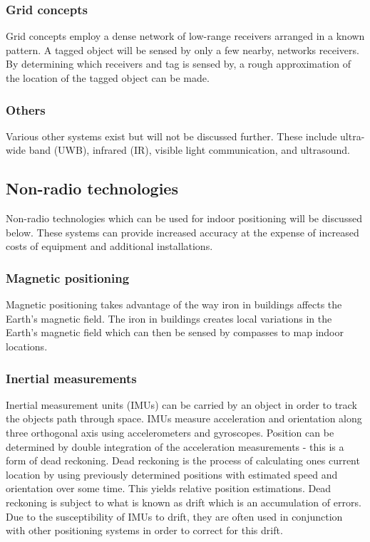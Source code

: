 \documentclass[11pt,a4paper]{article}
\begin{document}
	\subsubsection{Grid concepts}
		Grid concepts employ a dense network of low-range receivers arranged in a known pattern. A tagged object will be sensed by only a few nearby, networks receivers. By determining which receivers and tag is sensed by, a rough approximation of the location of the tagged object can be made.
	
	\subsubsection{Others}
		Various other systems exist but will not be discussed further. These include ultra-wide band (UWB), infrared (IR), visible light communication, and ultrasound.
	
	\subsection{Non-radio technologies}
		Non-radio technologies which can be used for indoor positioning will be discussed below. These systems can provide increased accuracy at the expense of increased costs of equipment and additional installations.
	
	\subsubsection{Magnetic positioning}
		Magnetic positioning takes advantage of the way iron in buildings affects the Earth's magnetic field. The iron in buildings creates local variations in the Earth's magnetic field which can then be sensed by compasses to map indoor locations.
		\cite{supreeth_sudhakaran_geospatial_2014}
	
	\subsubsection{Inertial measurements}
		Inertial measurement units (IMUs) can be carried by an object in order to track the objects path through space. IMUs measure acceleration and orientation along three orthogonal axis using accelerometers and gyroscopes. Position can be determined by double integration of the acceleration measurements - this is a form of dead reckoning. Dead reckoning is the process of calculating ones current location by using previously determined positions with estimated speed and orientation over some time. This yields relative position estimations. Dead reckoning is subject to what is known as drift which is an accumulation of errors. Due to the susceptibility of IMUs to drift, they are often used in conjunction with other positioning systems in order to correct for this drift.
\end{document}
